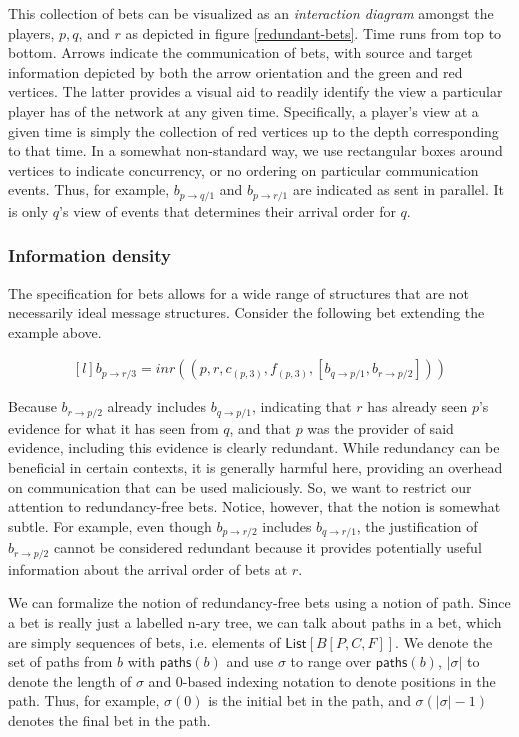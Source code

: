 \documentclass[]{acm_proc_article-sp}
\numberwithin{equation}{subsection}
\begin{document}
This collection of bets can be visualized as an \emph{interaction
  diagram} amongst the players, $p,q$, and $r$ as depicted in figure
\ref{redundant-bets}. Time runs from top to bottom. Arrows indicate
the communication of bets, with source and target information depicted
by both the arrow orientation and the green and red vertices. The
latter provides a visual aid to readily identify the view a particular
player has of the network at any given time. Specifically, a player's
view at a given time is simply the collection of red vertices up to
the depth corresponding to that time. In a somewhat non-standard way,
we use rectangular boxes around vertices to indicate concurrency, or
no ordering on particular communication events. Thus, for example,
$b_{p \to q/1}$ and $b_{p \to r/1}$ are indicated as sent in parallel. It
is only $q$'s view of events that determines their arrival order for
$q$.

\subsubsection{Information density}

The specification for bets allows for a wide range of structures that
are not necessarily ideal message structures. Consider the following
bet extending the example above.

\begin{equation*}
  \begin{aligned}[l]
    b_{p \to r/3} = inr( ( p, r, c_{(p,3)}, f_{(p,3)}, [b_{q \to p/1},b_{r \to p/2}] ) )
  \end{aligned}
\end{equation*}

Because $b_{r \to p/2}$ already includes $b_{q \to p/1}$, indicating
that $r$ has already seen $p$'s evidence for what it has seen from
$q$, and that $p$ was the provider of said evidence, including this
evidence is clearly redundant. While redundancy can be beneficial in
certain contexts, it is generally harmful here, providing an overhead
on communication that can be used maliciously. So, we want to restrict
our attention to redundancy-free bets. Notice, however, that the
notion is somewhat subtle. For example, even though $b_{p \to r /2}$
includes $b_{q \to r/1}$, the justification of $b_{r \to p/2}$ cannot be
considered redundant because it provides potentially useful
information about the arrival order of bets at $r$.

We can formalize the notion of redundancy-free bets using a notion of
path. Since a bet is really just a labelled n-ary tree, we can talk
about paths in a bet, which are simply sequences of bets,
i.e. elements of $\mathsf{List}[B[P,C,F]]$. We denote the set of paths
from $b$ with $\mathsf{paths}(b)$ and use $\sigma$ to range
over $\mathsf{paths}(b)$, $|\sigma|$ to denote the length of $\sigma$ and
0-based indexing notation to denote positions in the path. Thus, for
example, $\sigma(0)$ is the initial bet in the path, and $\sigma(
|\sigma| - 1)$ denotes the final bet in the path.
\end{document}
